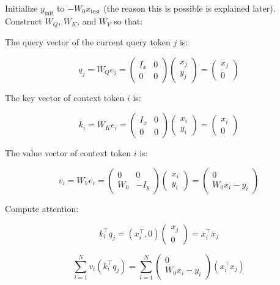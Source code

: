 Initialize \(y_{\mathrm{init}}\) to \(-W_0x_{\mathrm{test}}\) (the reason this is possible is explained later). Construct \(W_Q\), \(W_K\), and \(W_V\) so that:

The query vector of the current query token \(j\) is:

\[
q_j=W_Q e_j=\begin{pmatrix}I_x&0\\0&0\end{pmatrix}\begin{pmatrix}x_j\\y_j\end{pmatrix}=\begin{pmatrix}x_j\\0\end{pmatrix}
\]

The key vector of context token \(i\) is:

\[
k_i=W_K e_i=\begin{pmatrix}I_x&0\\0&0\end{pmatrix}\begin{pmatrix}x_i\\y_i\end{pmatrix}=\begin{pmatrix}x_i\\0\end{pmatrix}
\]

The value vector of context token \(i\) is:

\[
v_i=W_V e_i=\begin{pmatrix}0&0\\W_0&-I_y\end{pmatrix}\begin{pmatrix}x_i\\y_i\end{pmatrix}=\begin{pmatrix}0\\W_0x_i-y_i\end{pmatrix}
\]

Compute attention:

\[
k_i^\top q_j=(x_i^\top,0)\begin{pmatrix}x_j\\0\end{pmatrix}=x_i^\top x_j
\]

\[
\sum_{i=1}^{N}v_i(k_i^\top q_j)=\sum_{i=1}^{N}\begin{pmatrix}0\\W_0x_i-y_i\end{pmatrix}(x_i^\top x_j)
\]


